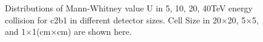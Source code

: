 \documentclass[final,1p,11pt]{elsarticle}
\begin{document}
\begin{figure}
\begin{center}
{   }
   \end{center}
\caption{Distributions of Mann-Whitney value U in 5, 10, 20, 40TeV energy collision for c2b1 in different detector sizes. Cell Size in 20$\times$20, 5$\times$5, and 1$\times$1(cm$\times$cm) are shown here.}
\label{fig:cluster_c2b1_tau32}
\end{figure}
\end{document}
